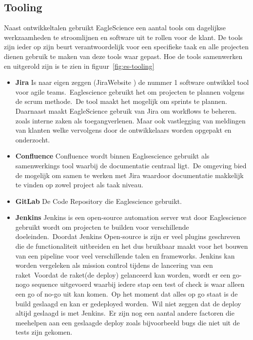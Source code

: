 \subsection{Tooling}
Naast ontwikkeltalen gebruikt EagleScience een aantal tools om dagelijkse werkzaamheden te stroomlijnen en software uit te rollen voor de klant. De tools zijn ieder op zijn beurt verantwoordelijk voor een specifieke taak en alle projecten dienen gebruik te maken van deze tools waar gepast. Hoe de tools samenwerken en uitgerold zijn is te zien in figuur~\ref{fig:es-tooling}

\begin{itemize}
    \item \textbf{Jira} Is naar eigen zeggen (JiraWebsite ) de nummer 1 software ontwikkel tool voor agile teams.\ Eaglescience gebruikt het om projecten te plannen volgens de scrum methode.\ De tool maakt het mogelijk om sprints te plannen. Daarnaast maakt EagleScience gebruik van Jira om workflows te beheren. zoals interne zaken als toegangverlenen. Maar ook vastlegging van meldingen van klanten welke vervolgens door de ontwikkelaars worden opgepakt en onderzocht.
    \item \textbf{Confluence}
    Confluence wordt binnen Eaglsescience gebruikt als samenwerkings tool waarbij de documentatie centraal ligt.\ De omgeving bied de mogelijk om samen te werken met Jira waardoor documentatie makkelijk te vinden op zowel project als taak niveau.
    \item \textbf{GitLab}
    De Code Repository die Eaglescience gebruikt.
    \item \textbf{Jenkins}
    Jenkins is een open-source automation server wat door Eaglescience gebruikt wordt om projecten te builden voor verschillende doeleinden.\ Doordat Jenkins Open-source is zijn er veel plugins geschreven die de functionaliteit uitbreiden en het dus bruikbaar maakt voor het bouwen van een pipeline voor veel verschillende talen en frameworks.
    Jenkins kan worden vergeleken als mission control tijdens de lancering van een raket\ Voordat de raket(de deploy) gelanceerd kan worden, wordt er een go-nogo sequence uitgevoerd waarbij iedere stap een test of check is waar alleen een go of no-go uit kan komen.\ Op het moment dat alles op go staat is de build geslaagd en kan er gedeployed worden.\ Wil niet zeggen dat de deploy altijd geslaagd is met Jenkins.\ Er zijn nog een aantal andere factoren die meehelpen aan een geslaagde deploy zoals bijvoorbeeld bugs die niet uit de tests zijn gekomen.
\end{itemize}


